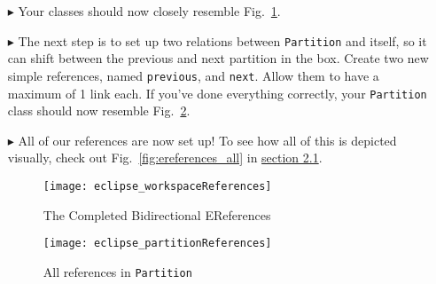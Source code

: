 \begin{itemize}
\item[$\blacktriangleright$] Your classes should now closely resemble Fig.~\ref{fig:allReferences}.

\item[$\blacktriangleright$] The next step is to set up two relations between \texttt{Partition} and itself, so it can shift between the previous and next
partition in the box. Create two new simple references, named \texttt{previous}, and \texttt{next}. Allow them to have a maximum of 1 link each. If you've done
everything correctly, your \texttt{Partition} class should now resemble Fig.~\ref{fig:partitionReferences}.

\item[$\blacktriangleright$] All of our references are now set up! To see how all of this is depicted visually, check out Fig.~\ref{fig:ereferences_all} in
\hyperlink{sec:static vis}{section 2.1}.

\newpage

\begin{figure}[htbp]
	\centering
  \texttt{[image: eclipse\_workspaceReferences]}
	\caption{The Completed Bidirectional EReferences}
	\label{fig:allReferences}
\end{figure} 

\vspace{2cm}

\begin{figure}[htbp]
	\centering
  \texttt{[image: eclipse\_partitionReferences]}
	\caption{All references in \texttt{Partition}}
	\label{fig:partitionReferences}
\end{figure} 

\end{itemize}
